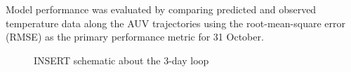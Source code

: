 Model performance was evaluated by comparing predicted and observed
temperature data along the AUV trajectories using the root-mean-square
error (RMSE) as the primary performance metric for 31 October.

\begin{figure}
    \centering
    \caption{INSERT schematic about the 3-day loop}
    \label{fig:temperatureprofiles}
\end{figure}


%
    






